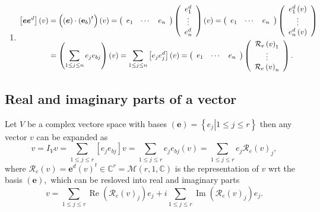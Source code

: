 \documentclass[aps,preprint]{revtex4}%
\begin{document}
\begin{enumerate}
\item
\begin{align}
\left[  \boldsymbol{ee}^{d}\right]  \left(  v\right)   &  =\left(  \left(
\boldsymbol{e}\right)  \cdot\left(  \mathbf{e}_{b}\right)  ^{t}\right)
\left(  v\right)  =\left(
\begin{array}
[c]{ccc}%
e_{1} & \cdots & e_{n}%
\end{array}
\right)  \left(
\begin{array}
[c]{c}%
e_{1}^{d}\\
\vdots\\
e_{n}^{d}%
\end{array}
\right)  \left(  v\right)  =\left(
\begin{array}
[c]{ccc}%
e_{1} & \cdots & e_{n}%
\end{array}
\right)  \left(
\begin{array}
[c]{c}%
e_{1}^{d}\left(  v\right) \\
\vdots\\
e_{n}^{d}\left(  v\right)
\end{array}
\right) \\
&  =\left(  \sum_{1\leq j\leq n}e_{j}e_{bj}\right)  \left(  v\right)
=\sum_{1\leq j\leq n}\left[  e_{j}e_{j}^{d}\right]  \left(  v\right)  =\left(
%
\begin{array}
[c]{ccc}%
e_{1} & \cdots & e_{n}%
\end{array}
\right)  \left(
\begin{array}
[c]{c}%
\mathcal{R}_{e}\left(  v\right)  _{1}\\
\vdots\\
\mathcal{R}_{e}\left(  v\right)  _{n}%
\end{array}
\right)  .
\end{align}

\end{enumerate}

\subsection{Real and imaginary parts of a vector}

Let $V$ be a complex vectore space with bases $\left(  \boldsymbol{e}\right)
=\left\{  \left.  e_{j}\right\vert 1\leq j\leq r\right\}  $ then any vector
$v$ can be expanded as
\begin{equation}
v=I_{V}v=\sum_{1\leq j\leq r}\left[  e_{j}e_{bj}\right]  v=\sum_{1\leq j\leq
r}e_{j}e_{bj}\left(  v\right)  =\sum_{1\leq j\leq r}e_{j}\mathcal{R}%
_{e}\left(  v\right)  _{j},
\end{equation}
where $\mathcal{R}_{e}\left(  v\right)  =\boldsymbol{e}^{d}\left(  v\right)
^{t}\in\mathbb{C}^{r}=\mathcal{M}\left(  r,1,\mathbb{C}\right)  $ is the
representation of $v$ wrt the basis $\left(  \boldsymbol{e}\right)  ,$ which
can be resloved into real and imaginary parts
\begin{equation}
v=\sum_{1\leq j\leq r}\operatorname{Re}\left(  \mathcal{R}_{e}\left(
v\right)  _{j}\right)  e_{j}+i\sum_{1\leq j\leq r}\operatorname{Im}\left(
\mathcal{R}_{e}\left(  v\right)  _{j}\right)  e_{j}.
\end{equation}
\end{document}
